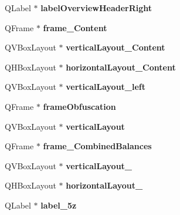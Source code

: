 \begin{DoxyCompactItemize}
Q\+Label $\ast$ {\bfseries label\+Overview\+Header\+Right}
\item 
\mbox{\label{class_ui___overview_page_abdfde0467c205d9dc3ee2aabbf4308e9}} 
Q\+Frame $\ast$ {\bfseries frame\+\_\+\+Content}
\item 
\mbox{\label{class_ui___overview_page_a10c5bd9b344197112996d87e1c0dadc2}} 
Q\+V\+Box\+Layout $\ast$ {\bfseries vertical\+Layout\+\_\+\+Content}
\item 
\mbox{\label{class_ui___overview_page_aae4472318f9ab39a89888f619bc6b318}} 
Q\+H\+Box\+Layout $\ast$ {\bfseries horizontal\+Layout\+\_\+\+Content}
\item 
\mbox{\label{class_ui___overview_page_ac591f0cf5daf9ac5e09685aaeb17c67b}} 
Q\+V\+Box\+Layout $\ast$ {\bfseries vertical\+Layout\+\_\+left}
\item 
\mbox{\label{class_ui___overview_page_ae76a621b0c6e02b3c8505472fa9557c3}} 
Q\+Frame $\ast$ {\bfseries frame\+Obfuscation}
\item 
\mbox{\label{class_ui___overview_page_aa61d0436af49678ba62353ffcd5c64a3}} 
Q\+V\+Box\+Layout $\ast$ {\bfseries vertical\+Layout}
\item 
\mbox{\label{class_ui___overview_page_ad46b68c73e6af087cc4958615ff94e1b}} 
Q\+Frame $\ast$ {\bfseries frame\+\_\+\+Combined\+Balances}
\item 
\mbox{\label{class_ui___overview_page_ac25730a17f6c73b63a5de9404436c29c}} 
Q\+V\+Box\+Layout $\ast$ {\bfseries vertical\+Layout\+\_}
\item 
\mbox{\label{class_ui___overview_page_a623a17279b2ec511d320cef7c764b854}} 
Q\+H\+Box\+Layout $\ast$ {\bfseries horizontal\+Layout\+\_}
\item 
\mbox{\label{class_ui___overview_page_ade04499f794182e5209a57c03ae9a044}} 
Q\+Label $\ast$ {\bfseries label\+\_\+5z}
\item 

\end{DoxyCompactItemize}
